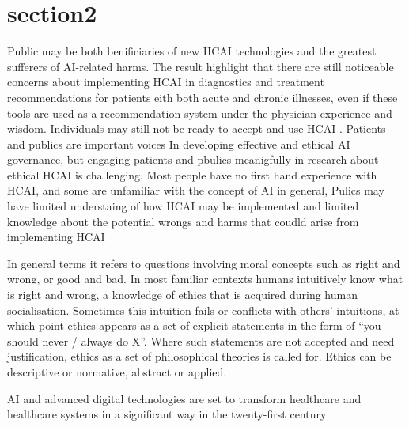\documentclass[paper=a4, fontsize=11pt]{scrartcl} %
\numberwithin{equation}{section} %
\numberwithin{figure}{section} %
\numberwithin{table}{section} %
\begin{document}
\section{section2}
Public may be both benificiaries of new HCAI technologies and the greatest sufferers of AI-related harms. The result highlight that there are still noticeable concerns about 
implementing HCAI in diagnostics and treatment recommendations for patients eith both acute and chronic illnesses, even if these tools are used as a recommendation system under the 
physician experience and wisdom. Individuals may still not be ready to accept and use HCAI \cite{esmaeilzadehPatientsPerceptionsHuman2021}. Patients and publics are important voices In
developing effective and ethical AI governance, but engaging patients and pbulics meanigfully in research about ethical HCAI is challenging. Most people have no first hand experience with HCAI,
and some are unfamiliar with the concept of AI in general, Pulics may have limited understaing of how HCAI may be implemented and limited knowledge about the potential wrongs and harms that coudld
arise from implementing HCAI \cite{frostPublicViewsEthical2022}



In general terms it refers to questions involving moral concepts such as right and wrong, or good and bad. 
In most familiar contexts humans intuitively know what is right and wrong, a knowledge of ethics that is acquired during human socialisation.
Sometimes this intuition fails or conflicts with others’ intuitions, at which point ethics appears as a set 
of explicit statements in the form of “you should never / always do X”. Where such statements are not accepted and need justification, 
ethics as a set of philosophical theories is called for. Ethics can be descriptive or normative, abstract or applied. 








AI and advanced digital technologies are set to transform healthcare and healthcare systems in a significant way in the twenty-first century




\end{document}

